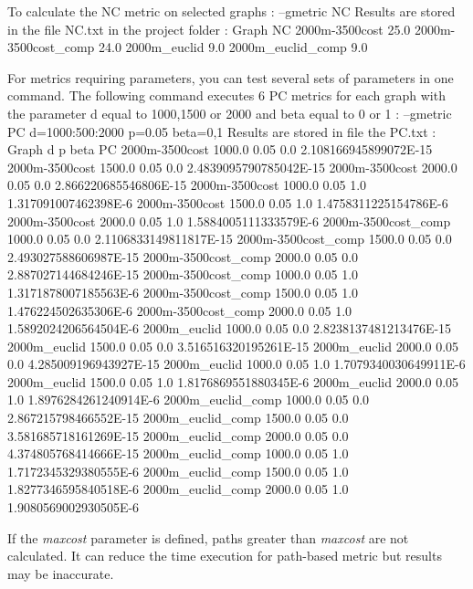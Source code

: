 \documentclass[a4paper,10pt]{report}
\newenvironment{cmd}
{\quote\Verbatim}
{\endVerbatim\endquote}
\begin{document}
To calculate the NC metric on selected graphs :
\begin{cmd}
--gmetric NC
\end{cmd}
Results are stored in the file NC.txt in the project folder :
\begin{cmd}
Graph                NC
2000m-3500cost       25.0
2000m-3500cost_comp  24.0
2000m_euclid         9.0
2000m_euclid_comp    9.0
\end{cmd}

For metrics requiring parameters, you can test several sets of parameters in one command. 
The following command executes 6 PC metrics for each graph with the parameter d equal to 1000,1500 or 2000 and beta equal to 0 or 1 :
\begin{cmd}
--gmetric PC d=1000:500:2000 p=0.05 beta=0,1
\end{cmd}
Results are stored in file the PC.txt :
\begin{cmd}
Graph               d     	p   	beta	PC
2000m-3500cost      1000.0	0.05	0.0	2.108166945899072E-15
2000m-3500cost      1500.0	0.05	0.0	2.4839095790785042E-15
2000m-3500cost      2000.0	0.05	0.0	2.866220685546806E-15
2000m-3500cost      1000.0	0.05	1.0	1.317091007462398E-6
2000m-3500cost      1500.0	0.05	1.0	1.4758311225154786E-6
2000m-3500cost      2000.0	0.05	1.0	1.5884005111333579E-6
2000m-3500cost_comp 1000.0	0.05	0.0	2.1106833149811817E-15
2000m-3500cost_comp 1500.0	0.05	0.0	2.493027588606987E-15
2000m-3500cost_comp 2000.0	0.05	0.0	2.887027144684246E-15
2000m-3500cost_comp 1000.0	0.05	1.0	1.3171878007185563E-6
2000m-3500cost_comp 1500.0	0.05	1.0	1.476224502635306E-6
2000m-3500cost_comp 2000.0	0.05	1.0	1.5892024206564504E-6
2000m_euclid        1000.0	0.05	0.0	2.8238137481213476E-15
2000m_euclid        1500.0	0.05	0.0	3.516516320195261E-15
2000m_euclid        2000.0	0.05	0.0	4.285009196943927E-15
2000m_euclid        1000.0	0.05	1.0	1.7079340030649911E-6
2000m_euclid        1500.0	0.05	1.0	1.8176869551880345E-6
2000m_euclid        2000.0	0.05	1.0	1.8976284261240914E-6
2000m_euclid_comp   1000.0	0.05	0.0	2.867215798466552E-15
2000m_euclid_comp   1500.0	0.05	0.0	3.581685718161269E-15
2000m_euclid_comp   2000.0	0.05	0.0	4.374805768414666E-15
2000m_euclid_comp   1000.0	0.05	1.0	1.7172345329380555E-6
2000m_euclid_comp   1500.0	0.05	1.0	1.8277346595840518E-6
2000m_euclid_comp   2000.0	0.05	1.0	1.9080569002930505E-6
\end{cmd}

If the \textit{maxcost} parameter is defined, paths greater than \textit{maxcost} are not calculated. It can reduce the time execution for path-based metric but results may be inaccurate. 
\end{document}
